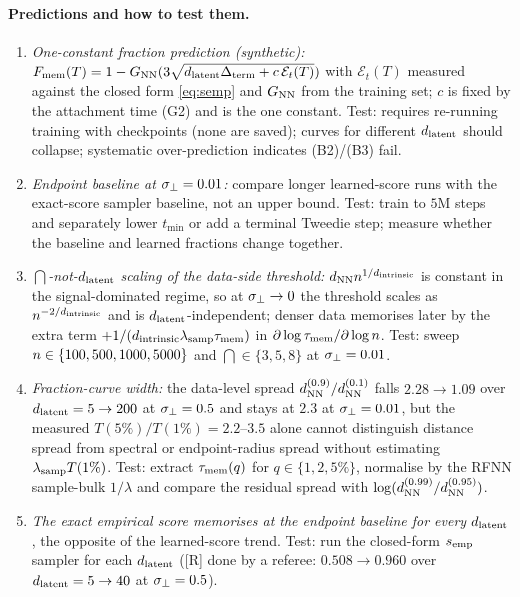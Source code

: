 \paragraph{Predictions and how to test them.}
\begin{enumerate}
\item \emph{One-constant fraction prediction (synthetic):} $F_{\rm mem}(T)=1-G_{\rm NN}(3\sqrt{d_{\mathrm{latent}}\Delta_{\rm term}+c\,\mathcal E_t(T)})$ with $\mathcal E_t(T)$ measured against the closed form \eqref{eq:semp} and $G_{\rm NN}$ from the training set; $c$ is fixed by the attachment time (G2) and is the one constant. Test: requires re-running training with checkpoints (none are saved); curves for different $d_{\mathrm{latent}}$ should collapse; systematic over-prediction indicates (B2)/(B3) fail.
\item \emph{Endpoint baseline at $\sigma_{\perp}=0.01$:} compare longer learned-score runs with the exact-score sampler baseline, not an upper bound. Test: train to $5$M steps and separately lower $t_{\min}$ or add a terminal Tweedie step; measure whether the baseline and learned fractions change together.
\item \emph{$\dint$-not-$d_{\mathrm{latent}}$ scaling of the data-side threshold:} $d_{\rm NN}n^{1/d_{\mathrm{intrinsic}}}$ is constant in the signal-dominated regime, so at $\sigma_{\perp}\to0$ the threshold scales as $n^{-2/d_{\mathrm{intrinsic}}}$ and is $d_{\mathrm{latent}}$-independent; denser data memorises later by the extra term $+1/(d_{\mathrm{intrinsic}}\lambda_{\rm samp}\tau_{\mathrm{mem}})$ in $\partial\log\tau_{\mathrm{mem}}/\partial\log n$. Test: sweep $n\in\{100,500,1000,5000\}$ and $\dint\in\{3,5,8\}$ at $\sigma_{\perp}=0.01$.
\item \emph{Fraction-curve width:} the data-level spread $d^{(0.9)}_{\rm NN}/d^{(0.1)}_{\rm NN}$ falls $2.28\to1.09$ over $d_{\mathrm{latent}}=5\to200$ at $\sigma_{\perp}=0.5$ and stays at $2.3$ at $\sigma_{\perp}=0.01$, but the measured $T(5\%)/T(1\%)=2.2$--$3.5$ alone cannot distinguish distance spread from spectral or endpoint-radius spread without estimating $\lambda_{\rm samp}T(1\%)$. Test: extract $\tau_{\mathrm{mem}}(q)$ for $q\in\{1,2,5\%\}$, normalise by the RFNN sample-bulk $1/\lambda$ and compare the residual spread with $\log(d^{(0.99)}_{\rm NN}/d^{(0.95)}_{\rm NN})$.
\item \emph{The exact empirical score memorises at the endpoint baseline for every $d_{\mathrm{latent}}$}, the opposite of the learned-score trend. Test: run the closed-form $s_{\rm emp}$ sampler for each $d_{\mathrm{latent}}$ ([R] done by a referee: $0.508\to0.960$ over $d_{\mathrm{latent}}=5\to40$ at $\sigma_{\perp}=0.5$).
\end{enumerate}

